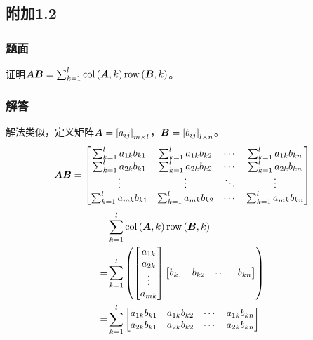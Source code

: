 \documentclass{beamer}
\begin{document}
\subsection*{附加1.2}

\begin{frame}
\frametitle{题面}

证明\(\boldsymbol{A}\boldsymbol{B}=\sum_{k=1}^l\mathrm{col}\left( \boldsymbol{A},k \right)\mathrm{row}\left( \boldsymbol{B},k \right)\)。

\end{frame}

\begin{frame}[allowframebreaks]
\frametitle{解答}

解法类似，定义矩阵\(\boldsymbol{A}=\left[ a_{ij} \right]_{m\times l}\)，\(\boldsymbol{B}=\left[ b_{ij} \right]_{l\times n}\)。
    \begin{equation*}
        \boldsymbol{A}\boldsymbol{B}=
        \begin{bmatrix}
            \sum_{k=1}^la_{1k}b_{k1} & \sum_{k=1}^la_{1k}b_{k2} & \cdots & \sum_{k=1}^la_{1k}b_{kn} \\
            \sum_{k=1}^la_{2k}b_{k1} & \sum_{k=1}^la_{2k}b_{k2} & \cdots & \sum_{k=1}^la_{2k}b_{kn} \\
            \vdots                   & \vdots                   & \ddots & \vdots                   \\
            \sum_{k=1}^la_{mk}b_{k1} & \sum_{k=1}^la_{mk}b_{k2} & \cdots & \sum_{k=1}^la_{mk}b_{kn}
        \end{bmatrix}
    \end{equation*}
    \begin{align*}
          & \sum_{k=1}^l\mathrm{col}\left( \boldsymbol{A},k \right)\mathrm{row}\left( \boldsymbol{B},k \right) \\ =&\sum_{k=1}^l
        \left( 
            \begin{bmatrix}
                a_{1k} \\a_{2k}\\\vdots\\a_{mk}
            \end{bmatrix}
            \begin{bmatrix}
                b_{k1} & b_{k2} & \cdots & b_{kn}
            \end{bmatrix}
         \right)                                            \\
        = & \sum_{k=1}^l
        \begin{bmatrix}
            a_{1k}b_{k1} & a_{1k}b_{k2} & \cdots & a_{1k}b_{kn} \\
            a_{2k}b_{k1} & a_{2k}b_{k2} & \cdots & a_{2k}b_{kn} \\

\end{bmatrix}
\end{align*}
\end{frame}
\end{document}
